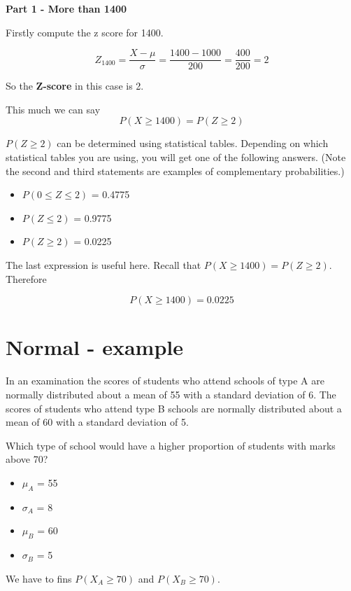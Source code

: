 ﻿\documentclass[]{report}
\begin{document}
\noindent \textbf{Part 1 -  More than 1400}

Firstly compute the z score for 1400.

\[ Z_{1400} =  \frac{X - \mu}{\sigma} = \frac{1400 - 1000}{200} = \frac{400}{200} = 2  \]

So the \textbf{Z-score} in this case is 2.

This much we can say
\[P(X \geq 1400) = P(Z \geq 2)\]

$P(Z \geq 2)$ can be determined using statistical tables.
Depending on which statistical tables you are using, you will get one of the following answers. (Note the 
second and third statements are examples of complementary probabilities.)
\begin{itemize}
	\item $P (0 \leq Z \leq 2)$ = 0.4775
	\item $P ( Z \leq 2)$ = 0.9775
	\item $P ( Z \geq 2)$ = 0.0225
\end{itemize}
The last expression is useful here. Recall that $P(X \geq 1400) = P(Z \geq 2)$. Therefore

\[P(X \geq 1400) = 0.0225\]
	

	

\section{Normal - example}

In an examination the scores of students who attend schools of type A are
normally distributed about a mean of 55 with a standard deviation of 6. The
scores of students who attend type B schools are normally distributed about a
mean of 60 with a standard deviation of 5.


Which type of school would have a higher proportion of students with marks above 70?

\begin{multicols}{2}
\begin{itemize}
	\item $\mu_A$ = 55
	\item $\sigma_A$ = 8
	
	\item $\mu_B$ = 60
	\item $\sigma_B$ = 5
\end{itemize}
\end{multicols}
We have to fins $P(X_A \geq 70)$
and $P(X_B \geq 70)$.
\end{document}
